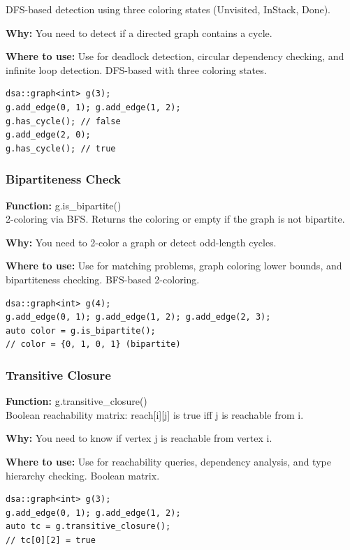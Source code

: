 \documentclass[11pt]{article}
\begin{document}
DFS-based detection using three coloring states (Unvisited, InStack, Done).

\textbf{Why:} You need to detect if a directed graph contains a cycle. \par \textbf{Where to use:} Use for deadlock detection, circular dependency checking, and infinite loop detection. DFS-based with three coloring states.

\begin{lstlisting}
dsa::graph<int> g(3);
g.add_edge(0, 1); g.add_edge(1, 2);
g.has_cycle(); // false
g.add_edge(2, 0);
g.has_cycle(); // true
\end{lstlisting}

\subsubsection{Bipartiteness Check}
\textbf{Function:} g.is\_bipartite()\\

2-coloring via BFS. Returns the coloring or empty if the graph is not bipartite.

\textbf{Why:} You need to 2-color a graph or detect odd-length cycles. \par \textbf{Where to use:} Use for matching problems, graph coloring lower bounds, and bipartiteness checking. BFS-based 2-coloring.

\begin{lstlisting}
dsa::graph<int> g(4);
g.add_edge(0, 1); g.add_edge(1, 2); g.add_edge(2, 3);
auto color = g.is_bipartite();
// color = {0, 1, 0, 1} (bipartite)
\end{lstlisting}

\subsubsection{Transitive Closure}
\textbf{Function:} g.transitive\_closure()\\

Boolean reachability matrix: reach[i][j] is true iff j is reachable from i.

\textbf{Why:} You need to know if vertex j is reachable from vertex i. \par \textbf{Where to use:} Use for reachability queries, dependency analysis, and type hierarchy checking. Boolean matrix.

\begin{lstlisting}
dsa::graph<int> g(3);
g.add_edge(0, 1); g.add_edge(1, 2);
auto tc = g.transitive_closure();
// tc[0][2] = true
\end{lstlisting}
\end{document}
